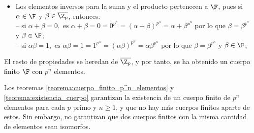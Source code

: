 \begin{dem}{\cite[p.~416]{GamboaAnillos}}
\begin{itemize}
        -- Para el producto se tiene:
        \[
        (\alpha \beta)^{p^n} = \alpha^{p^n}\beta^{p^n} = \alpha \beta \in \F.
        \]

        \item Los elementos inversos para la suma y el producto pertenecen a $\F$, pues si $\alpha\in \F$ y $\beta\in \overline{\Z_p}$, entonces:\\
        -- si $\alpha + \beta = 0, \text{ es } \alpha + \beta = 0 = 0^{p^n} =
        (\alpha + \beta)^{p^n} = \alpha + \beta^{p^n}$
        por lo que $\beta = \beta^{p^n}$ y $\beta\in \F$;\\
        -- si $\alpha \beta = 1, \text{ es } \alpha\beta = 1 = 1^{p^n} =
        (\alpha \beta)^{p^n} = \alpha  \beta^{p^n}$ por lo que $\beta = \beta^{p^n}$ y $\beta\in \F$;
    \end{itemize}
    El resto de propiedades se heredan de $\overline{\Z_p}$, y por tanto, se ha obtenido un cuerpo finito $\F$ con $p^n$ elementos.
\end{dem}

Los teoremas \ref{teorema:cuerpo_finito_p^n_elementos} y \ref{teorema:existencia_cuerpo} garantizan la existencia de un cuerpo finito de $p^n$ elementos para cada $p$ primo y $n\geq 1$, y que no hay más cuerpos finitos aparte de estos. Sin embargo, no garantizan que dos cuerpos finitos con la misma cantidad de elementos sean isomorfos. 

\begin{teorema}\label{Teorema:unicidad}\end{teorema}

